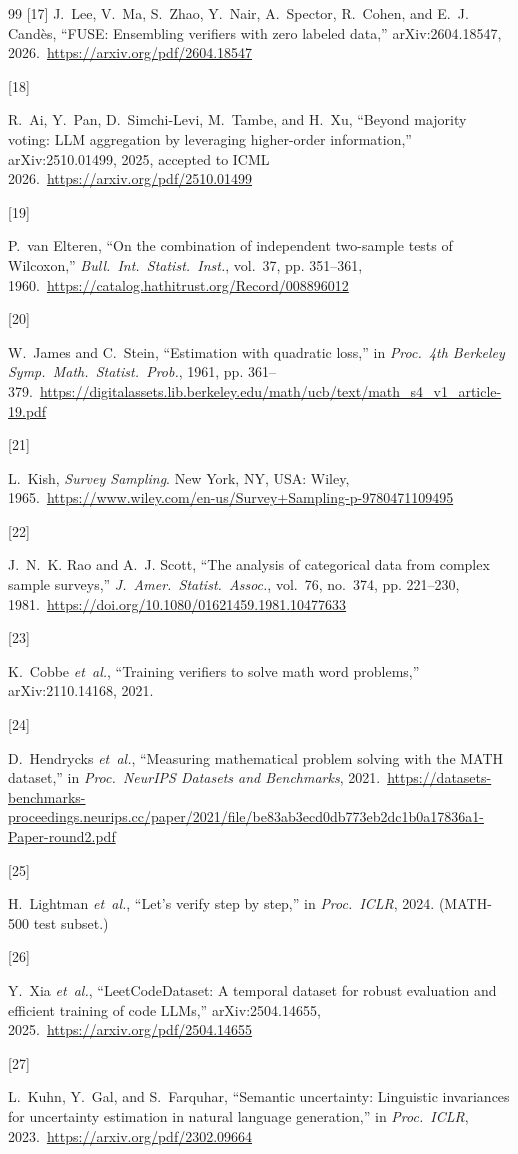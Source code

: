 \documentclass[conference]{IEEEtran}
\begin{document}
\begin{thebibliography}{99}
\hypertarget{bib:fuse2026}{[17]} 
J.~Lee, V.~Ma, S.~Zhao, Y.~Nair, A.~Spector, R.~Cohen, and E.~J. Cand\`es, ``FUSE: Ensembling verifiers with zero labeled data,'' arXiv:2604.18547, 2026.\ \url{https://arxiv.org/pdf/2604.18547}

\hypertarget{bib:beyondmajority2025}{[18]} 
R.~Ai, Y.~Pan, D.~Simchi-Levi, M.~Tambe, and H.~Xu, ``Beyond majority voting: LLM aggregation by leveraging higher-order information,'' arXiv:2510.01499, 2025, accepted to ICML 2026.\ \url{https://arxiv.org/pdf/2510.01499}

\hypertarget{bib:vanelteren1960}{[19]} 
P.~van Elteren, ``On the combination of independent two-sample tests of Wilcoxon,'' \emph{Bull.\ Int.\ Statist.\ Inst.}, vol.~37, pp. 351--361, 1960.\ \url{https://catalog.hathitrust.org/Record/008896012}

\hypertarget{bib:james1961estimation}{[20]} 
W.~James and C.~Stein, ``Estimation with quadratic loss,'' in \emph{Proc.\ 4th Berkeley Symp.\ Math.\ Statist.\ Prob.}, 1961, pp. 361--379.\ \url{https://digitalassets.lib.berkeley.edu/math/ucb/text/math_s4_v1_article-19.pdf}

\hypertarget{bib:kish1965}{[21]} 
L.~Kish, \emph{Survey Sampling}. New York, NY, USA: Wiley, 1965.\ \url{https://www.wiley.com/en-us/Survey+Sampling-p-9780471109495}

\hypertarget{bib:rao1981analysis}{[22]} 
J.~N.~K. Rao and A.~J. Scott, ``The analysis of categorical data from complex sample surveys,'' \emph{J.\ Amer.\ Statist.\ Assoc.}, vol.~76, no.~374, pp. 221--230, 1981.\ \url{https://doi.org/10.1080/01621459.1981.10477633}

\hypertarget{bib:gsm8k2021}{[23]} 
K.~Cobbe \emph{et~al.}, ``Training verifiers to solve math word problems,'' arXiv:2110.14168, 2021.

\hypertarget{bib:math500}{[24]} 
D.~Hendrycks \emph{et~al.}, ``Measuring mathematical problem solving with the MATH dataset,'' in \emph{Proc.\ NeurIPS Datasets and Benchmarks}, 2021.\ \url{https://datasets-benchmarks-proceedings.neurips.cc/paper/2021/file/be83ab3ecd0db773eb2dc1b0a17836a1-Paper-round2.pdf}

\hypertarget{bib:lightman2024verify}{[25]} 
H.~Lightman \emph{et~al.}, ``Let's verify step by step,'' in \emph{Proc.\ ICLR}, 2024. (MATH-500 test subset.)

\hypertarget{bib:leetcodedataset}{[26]} 
Y.~Xia \emph{et~al.}, ``LeetCodeDataset: A temporal dataset for robust evaluation and efficient training of code LLMs,'' arXiv:2504.14655, 2025.\ \url{https://arxiv.org/pdf/2504.14655}

\hypertarget{bib:kuhn2023semantic}{[27]} 
L.~Kuhn, Y.~Gal, and S.~Farquhar, ``Semantic uncertainty: Linguistic invariances for uncertainty estimation in natural language generation,'' in \emph{Proc.\ ICLR}, 2023.\ \url{https://arxiv.org/pdf/2302.09664}

\end{thebibliography}
\end{document}
